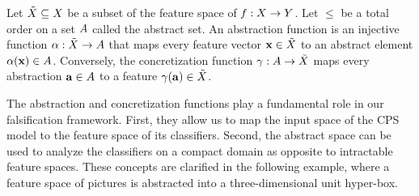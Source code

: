 
Let $\tilde{X} \subseteq X$ be a subset of the feature space of
$f : X \to Y$.
Let $\leq$ be a total order on a set $A$ called the abstract set. An abstraction function 
is an injective function $\alpha : \tilde{X} \to A$ that maps every feature vector $\mathbf{x} \in \tilde{X}$
to an abstract element $\alpha(\mathbf{x}) \in A$. Conversely, the concretization function
$\gamma : A \to \tilde{X}$ maps every abstraction $\mathbf{a} \in A$ to a feature $\gamma(\mathbf{a}) \in \tilde{X}$.

The abstraction and concretization functions play a fundamental
role in our falsification framework.
First, they allow us to map the input space of the CPS model to the
feature space of its classifiers. Second, the abstract space
can be used to analyze the classifiers on a compact domain
as opposite to intractable feature spaces.
These concepts are clarified in the following example, 
where a feature space of pictures is abstracted into a 
three-dimensional unit hyper-box.


